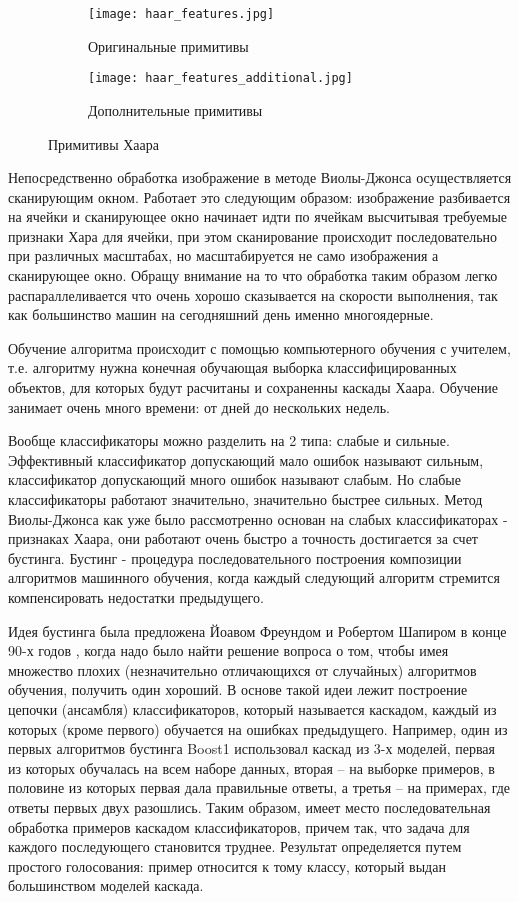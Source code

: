 \begin{figure}[ht]
\centering
  \begin{subfigure}[b]{0.4\textwidth} 
    \centering
    \texttt{[image: haar\_features.jpg]}  
    \caption{Оригинальные примитивы}
  \end{subfigure}
  \begin{subfigure}[b]{0.4\textwidth} 
    \centering
    \texttt{[image: haar\_features\_additional.jpg]}  
    \caption{Дополнительные примитивы}
  \end{subfigure}
  \caption{Примитивы Хаара}
  \label{fig:domain:search:violajones:haar_features}
\end{figure}

Непосредственно обработка изображение в методе Виолы-Джонса осуществляется сканирующим окном. Работает это следующим образом: изображение разбивается на ячейки и сканирующее окно начинает идти по ячейкам высчитывая требуемые признаки Хара для ячейки, при этом сканирование происходит последовательно при различных масштабах, но масштабируется не само изображения а сканирующее окно. Обращу внимание на то что обработка таким образом легко распараллеливается что очень хорошо сказывается на скорости выполнения, так как большинство машин на сегодняшний день именно многоядерные. 

Обучение алгоритма происходит с помощью компьютерного обучения с учителем, т.е. алгоритму нужна конечная обучающая выборка классифицированных объектов, для которых будут расчитаны и сохраненны каскады Хаара. Обучение занимает очень много времени: от дней до нескольких недель.

Вообще классификаторы можно разделить на 2 типа: слабые и сильные. Эффективный классификатор допускающий мало ошибок называют сильным, классификатор допускающий много ошибок называют слабым. Но слабые классификаторы работают значительно, значительно быстрее сильных. Метод Виолы-Джонса как уже было рассмотренно основан на слабых классификаторах - признаках Хаара, они работают очень быстро а точность достигается за счет бустинга. Бустинг - процедура последовательного построения композиции алгоритмов машинного обучения, когда каждый следующий алгоритм стремится компенсировать недостатки предыдущего. 

Идея бустинга была предложена Йоавом Фреундом и Робертом Шапиром в конце 90-х годов \cite{boosting}, когда надо было найти решение вопроса о том, чтобы имея множество плохих (незначительно отличающихся от случайных) алгоритмов обучения, получить один хороший. В основе такой идеи лежит построение цепочки (ансамбля) классификаторов, который называется каскадом, каждый из которых (кроме первого) обучается на ошибках предыдущего. 
Например, один из первых алгоритмов бустинга Boost1 использовал каскад из 3-х моделей, первая из которых обучалась на всем наборе данных, вторая -- на выборке примеров, в половине из которых первая дала правильные ответы, а третья -- на примерах, где ответы первых двух разошлись. Таким образом, имеет место последовательная обработка примеров каскадом классификаторов, причем так, что задача для каждого последующего становится труднее. Результат определяется путем простого голосования: пример относится к тому классу, который выдан большинством моделей каскада.

